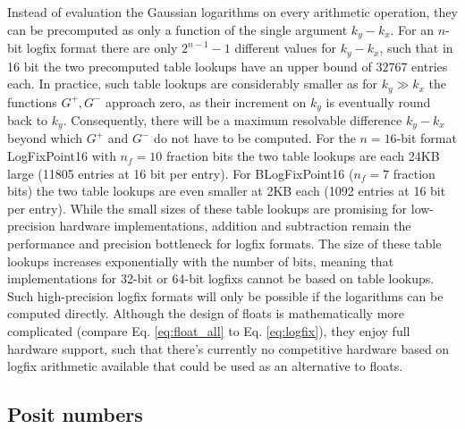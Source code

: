 Instead of evaluation the Gaussian logarithms on every arithmetic operation, they can be precomputed as only a function of the single argument
$k_y-k_x$. For an $n$-bit logfix format there are only $2^{n-1}-1$ different values for $k_y-k_x$, such that in 16 bit the two precomputed table
lookups have an upper bound of $32767$ entries each. In practice, such table lookups are considerably smaller as for $k_y \gg k_x$  the functions
$G^+,G^-$ approach zero, as their increment on $k_y$ is eventually round back to $k_y$. Consequently, there will be a maximum resolvable
difference $k_y-k_x$ beyond which $G^+$ and $G^-$ do not have to be computed. For the $n=16$-bit format LogFixPoint16 with $n_f=10$
fraction bits the two table lookups are each 24KB large (11805 entries at 16 bit per entry). For BLogFixPoint16 ($n_f=7$ fraction bits) the two
table lookups are even smaller at 2KB each (1092 entries at 16 bit per entry). While the small sizes of these table lookups are promising
for low-precision hardware implementations, addition and subtraction remain the performance and precision bottleneck for logfix
formats. The size of these table lookups increases exponentially with the number of bits, meaning that implementations
for 32-bit or 64-bit logfixs cannot be based on table lookups. Such high-precision logfix formats will only be possible
if the logarithms can be computed directly.  Although the design of floats is mathematically more complicated
(compare Eq. \ref{eq:float_all} to Eq. \ref{eq:logfix}), they enjoy full hardware support, such that there's currently no 
competitive hardware based on logfix arithmetic available that could be used as an alternative to floats.

	\subsection{Posit numbers}
	\label{sec:posits}


